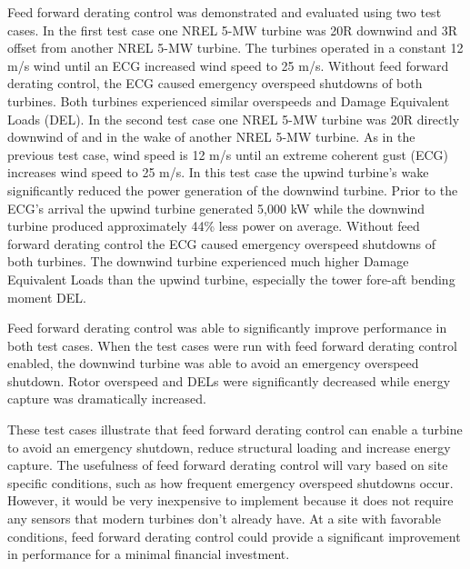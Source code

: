 Feed forward derating control was demonstrated and evaluated using two test cases. In the first test case one NREL 5-MW turbine was 20R downwind and 3R offset from another NREL 5-MW turbine. The turbines operated in a constant 12 m/s wind until an ECG increased wind speed to 25 m/s. Without feed forward derating control, the ECG caused emergency overspeed shutdowns of both turbines. Both turbines experienced similar overspeeds and Damage Equivalent Loads (DEL). In the second test case one NREL 5-MW turbine was 20R directly downwind of and in the wake of another NREL 5-MW turbine. As in the previous test case, wind speed is 12 m/s until an extreme coherent gust (ECG) increases wind speed to 25 m/s. In this test case the upwind turbine's wake significantly reduced the power generation of the downwind turbine. Prior to the ECG's arrival the upwind turbine generated 5,000 kW while the downwind turbine produced approximately 44\% less power on average. Without feed forward derating control the ECG caused emergency overspeed shutdowns of both turbines. The downwind turbine experienced much higher Damage Equivalent Loads than the upwind turbine, especially the tower fore-aft bending moment DEL. 

Feed forward derating control was able to significantly improve performance in both test cases. When the test cases were run with feed forward derating control enabled, the downwind turbine was able to avoid an emergency overspeed shutdown. Rotor overspeed and DELs were significantly decreased while energy capture was dramatically increased.

These test cases illustrate that feed forward derating control can enable a turbine to avoid an emergency shutdown, reduce structural loading and increase energy capture. The usefulness of feed forward derating control will vary based on site specific conditions, such as how frequent emergency overspeed shutdowns occur. However, it would be very inexpensive to implement because it does not require any sensors that modern turbines don't already have. At a site with favorable conditions, feed forward derating control could provide a significant improvement in performance for a minimal financial investment.